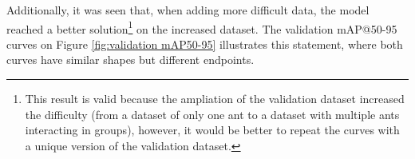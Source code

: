 
{
    Additionally, it was seen that, when adding more difficult data, the model reached a better solution\footnote{This result is valid because the ampliation of the validation dataset increased the difficulty (from a dataset of only one ant to a dataset with multiple ants interacting in groups), however, it would be better to repeat the curves with a unique version of the validation dataset.} on the increased dataset. 
    The validation \ac{mAP}@50-95 curves on Figure \ref{fig:validation mAP50-95} illustrates this statement, where both curves have similar shapes but different endpoints.
}

